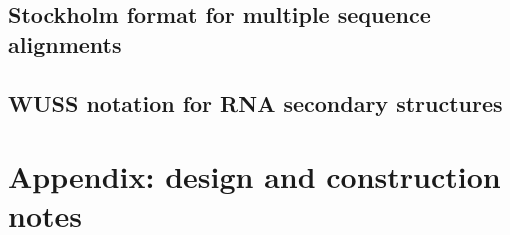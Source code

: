 \documentclass[11pt]{book}
\begin{document}
\section{Stockholm format for multiple sequence alignments}




\newpage
\section{WUSS notation for RNA secondary structures}




\newpage
\chapter{Appendix: design and construction notes}




\newpage
\newcommand{\bibfont}{\footnotesize}


\end{document}
